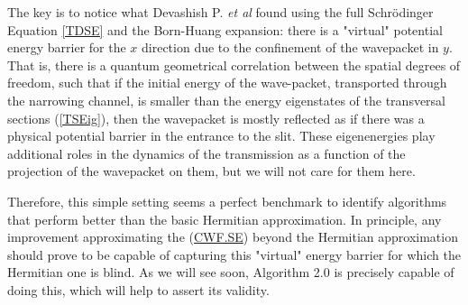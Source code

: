 \documentclass[11pt, a4paper]{article} %
\begin{document}
The key is to notice what Devashish P. {\em et al} \cite{Dev} found using the full Schrödinger Equation \ref{TDSE} and the Born-Huang expansion: there is a "virtual" potential energy barrier for the $x$ direction due to the confinement of the wavepacket in $y$. That is, there is a quantum geometrical correlation between the spatial degrees of freedom, such that if the initial energy of the wave-packet, transported through the narrowing channel, is smaller than the energy eigenstates of the transversal sections (\ref{TSEig}), then the wavepacket is mostly reflected as if there was a physical potential barrier in the entrance to the slit. These eigenenergies play additional roles in the dynamics of the transmission as a function of the projection of the wavepacket on them, but we will not care for them here.

Therefore, this simple setting seems a perfect benchmark to identify algorithms that perform better than the basic Hermitian approximation. In principle, any improvement approximating the (\hyperref[CWF.SE]{CWF.SE}) beyond the Hermitian approximation should prove to be capable of capturing this "virtual" energy barrier for which the Hermitian one is blind. As we will see soon, Algorithm 2.0 is precisely capable of doing this, which will help to assert its validity.
\end{document}
